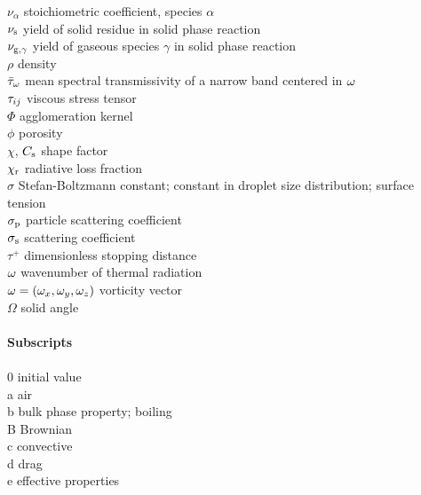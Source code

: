 \begin{tabbing}
$\nu_\alpha$              \> stoichiometric coefficient, species $\alpha$ \\
$\nu_{\rm s}$             \> yield of solid residue in solid phase reaction \\
$\nu_{\rm g,\gamma}$      \> yield of gaseous species $\gamma$ in solid phase reaction \\
$\rho$                    \> density \\
$\bar{\tau}_{\omega}$        \> mean spectral transmissivity of a narrow band centered in $\omega$ \\
$\mathbf{\tau}_{ij}$              \> viscous stress tensor \\
$\Phi$                    \> agglomeration kernel \\
$\phi$                    \> porosity \\
$\chi$, $C_{\rm s}$       \> shape factor \\
$\chi_{\rm r}$            \> radiative loss fraction \\
$\sigma$                  \> Stefan-Boltzmann constant; constant in droplet size distribution; surface tension \\
$\sigma_{\rm p}$          \> particle scattering coefficient \\
$\sigma_{\rm s}$          \> scattering coefficient \\
$\tau^+$                  \> dimensionless stopping distance \\
$\omega$                     \> wavenumber of thermal radiation \\
${\mathbf{\omega}}=(\omega_x,\omega_y,\omega_z)$    \> vorticity vector \\
$\Omega$                  \> solid angle \\
\hspace{0.1in}            \> \\
{\bf Subscripts}          \> \\
\hspace{0.1in}            \> \\
0                         \> initial value \\
a                         \> air \\
b                         \> bulk phase property; boiling \\
B                         \> Brownian \\
c                         \> convective \\
d                         \> drag \\
e                         \> effective properties \\

\end{tabbing}
